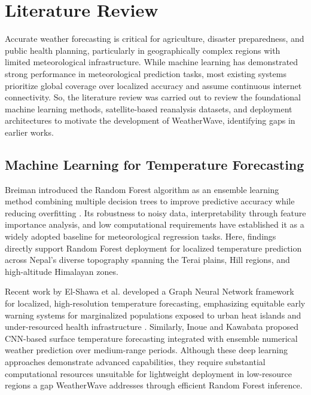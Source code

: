 \documentclass[conference]{IEEEtran}
\begin{document}
\section{Literature Review}
Accurate weather forecasting is critical for agriculture, disaster preparedness, and public health planning, particularly in geographically complex regions with limited meteorological infrastructure. While machine learning has demonstrated strong performance in meteorological prediction tasks, most existing systems prioritize global coverage over localized accuracy and assume continuous internet connectivity. So, the literature review was carried out to review the foundational machine learning methods, satellite-based reanalysis datasets, and deployment architectures to motivate the development of WeatherWave, identifying gaps in earlier works.

\subsection{Machine Learning for Temperature Forecasting}
Breiman introduced the Random Forest algorithm as an ensemble learning method combining multiple decision trees to improve predictive accuracy while reducing overfitting \cite{b1}. Its robustness to noisy data, interpretability through feature importance analysis, and low computational requirements have established it as a widely adopted baseline for meteorological regression tasks.
Here, \cite{b2} findings directly support Random Forest deployment for localized temperature prediction across Nepal's diverse topography spanning the Terai plains, Hill regions, and high-altitude Himalayan zones.

Recent work by El-Shawa et al. developed a Graph Neural Network framework for localized, high-resolution temperature forecasting, emphasizing equitable early warning systems for marginalized populations exposed to urban heat islands and under-resourced health infrastructure \cite{b3}. Similarly, Inoue and Kawabata proposed CNN-based surface temperature forecasting integrated with ensemble numerical weather prediction over medium-range periods\cite{b4}. Although these deep learning approaches demonstrate advanced capabilities, they require substantial computational resources unsuitable for lightweight deployment in low-resource regions a gap WeatherWave addresses through efficient Random Forest inference.
\end{document}
